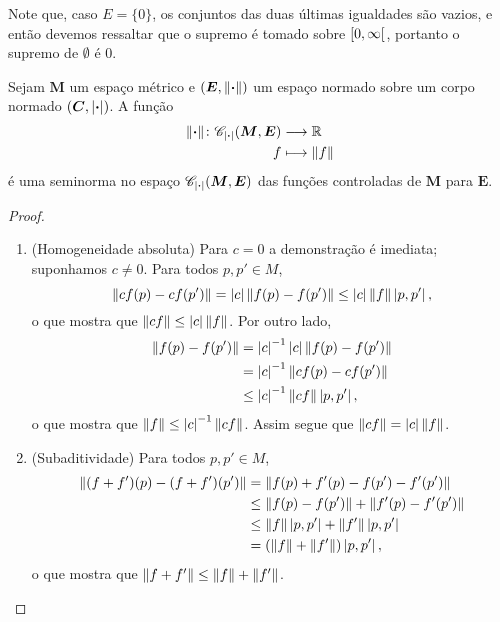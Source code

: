 Note que, caso $E = \{0\}$, os conjuntos das duas últimas igualdades são vazios, e então devemos ressaltar que o supremo é tomado sobre $\intfa{0}{\infty}$, portanto o supremo de $\emptyset$ é $0$.


\begin{proposition}
\label{prop:distorcao.seminorma}
Sejam $\bm M$ um espaço métrico e $(\bm E,\nor{\var})$ um espaço normado sobre um corpo normado $(\bm C,\abs{\var})$. A função
	\begin{align*}
	\func{\nor{\var}}{\Met(\bm M,\bm E)}{\R}{f}{\nor{f}}
	\end{align*}
é uma seminorma no espaço $\Met(\bm M,\bm E)$ das funções controladas de $\bm M$ para $\bm E$.
\end{proposition}
\begin{proof}
	\begin{enumerate}
	\item (Homogeneidade absoluta) Para $c=0$ a demonstração é imediata; suponhamos $c \neq 0$. Para todos $p,p' \in M$,
		\begin{equation*}
		\nor{cf(p)-cf(p')} = \abs{c}\nor{f(p)-f(p')} \leq \abs{c}\nor{f}\dist{p}{p'},
		\end{equation*}
	o que mostra que $\nor{cf} \leq \abs{c}\nor{f}$. Por outro lado,
		\begin{align*}
		\nor{f(p)-f(p')} &= \abs{c}\inv\abs{c}\nor{f(p)-f(p')} \\
			&= \abs{c}\inv\nor{cf(p)-cf(p')} \\
			&\leq \abs{c}\inv\nor{cf}\dist{p}{p'},
		\end{align*}
	o que mostra que $\nor{f} \leq \abs{c}\inv\nor{cf}$. Assim segue que $\nor{cf} = \abs{c}\nor{f}$.

	\item (Subaditividade) Para todos $p,p' \in M$,
		\begin{align*}
		\nor{(f+f')(p) - (f+f')(p')} &= \nor{f(p)+f'(p) - f(p')-f'(p')} \\
			&\leq \nor{f(p) - f(p')} + \nor{f'(p) - f'(p')} \\
			&\leq \nor{f}\dist{p}{p'} + \nor{f'}\dist{p}{p'} \\
			&= (\nor{f} + \nor{f'})\dist{p}{p'},
		\end{align*}
	o que mostra que $\nor{f+f'} \leq \nor{f} + \nor{f'}$.
	\qedhere
	\end{enumerate}
\end{proof}

